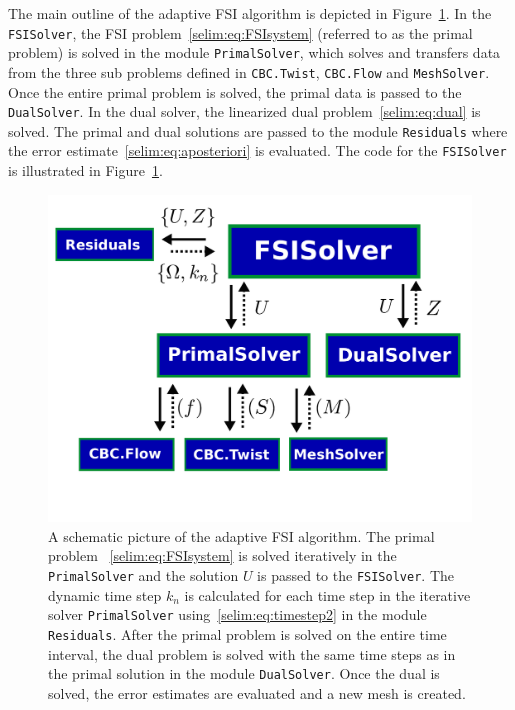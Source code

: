 The main outline of the adaptive FSI algorithm is depicted in
Figure~\ref{selim:fig:adaptiveMAP}. In the \texttt{FSISolver}, the FSI
problem~\eqref{selim:eq:FSIsystem} (referred to as the primal problem)
is solved in the module \texttt{PrimalSolver}, which solves and
transfers data from the three sub problems defined in
\texttt{CBC.Twist}, \texttt{CBC.Flow} and \texttt{MeshSolver}. Once
the entire primal problem is solved, the primal data is passed to the
\texttt{DualSolver}. In the dual solver, the linearized dual
problem~\eqref{selim:eq:dual} is solved. The primal and dual solutions
are passed to the module \texttt{Residuals} where the error
estimate~\eqref{selim:eq:aposteriori} is evaluated. The code for the
\texttt{FSISolver} is illustrated in
Figure~\ref{selim:fig:adaptiveMAP}.
\begin{figure}
\label{selim:fig:adaptiveMAP}
\includegraphics[width=1.0\textwidth]{chapters/selim/pdf/adaptive.pdf}
\caption{A schematic picture of the adaptive FSI algorithm. The primal
  problem ~\eqref{selim:eq:FSIsystem} is solved iteratively in the
  \texttt{PrimalSolver} and the solution $U$ is passed to the
  \texttt{FSISolver}. The dynamic time step $k_n$ is calculated for
  each time step in the iterative solver \texttt{PrimalSolver}
  using~\eqref{selim:eq:timestep2} in the module
  \texttt{Residuals}. After the primal problem is solved on the entire
  time interval, the dual problem is solved with the same time steps
  as in the primal solution in the module \texttt{DualSolver}. Once
  the dual is solved, the error estimates are evaluated and a new mesh
  is created.}
\end{figure}

